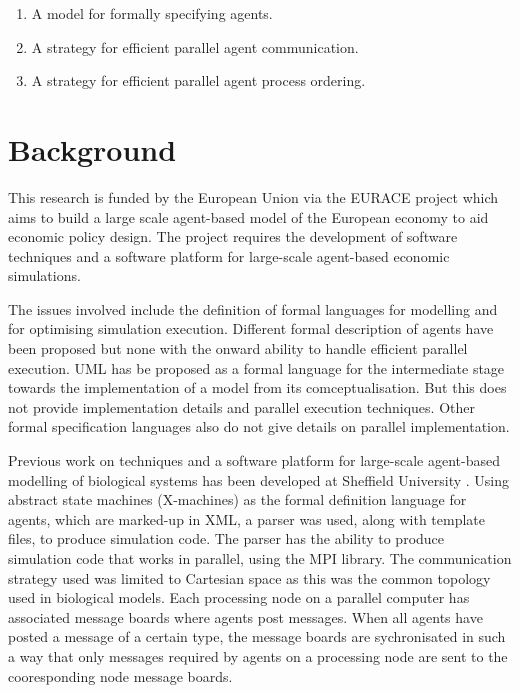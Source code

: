 \documentclass{aamas2009}
\begin{document}
\begin{enumerate}
  \item A model for formally specifying agents.
  \item A strategy for efficient parallel agent communication.
  \item A strategy for efficient parallel agent process ordering.
\end{enumerate}



\section{Background}

This research is funded by the European Union via the EURACE project which aims
to build a large scale agent-based model of the European economy to aid
economic policy design. The project requires the development of software techniques and
a software platform for large-scale agent-based economic simulations.

The issues involved include the definition of formal languages for modelling
and for optimising simulation execution.
Different formal description of agents have been proposed but none with the
onward ability to handle efficient parallel execution. UML has be proposed as a
formal language for the intermediate stage towards the implementation of a model
from its comceptualisation. But this does not provide implementation details and
parallel execution techniques. Other formal specification languages
\cite{object-z_statecharts, slabs} also do not give details on parallel
implementation.

Previous work on techniques and
a software platform for large-scale agent-based modelling of biological systems
has been developed at Sheffield University \cite{179, 256, 221}. Using abstract state
machines (X-machines) as the formal definition language for agents, which are
marked-up in XML, a parser was used, along with template files, to produce simulation code.
The parser has the ability to produce simulation code that works in parallel,
using the MPI library. The communication strategy used was limited to Cartesian
space as this was the common topology used in biological models. Each
processing node on a parallel computer has associated message boards where
agents post messages. When all agents have posted a message of a certain type,
the message boards are sychronisated in such a way that only messages required
by agents on a processing node are sent to the cooresponding node message
boards.
\end{document}
